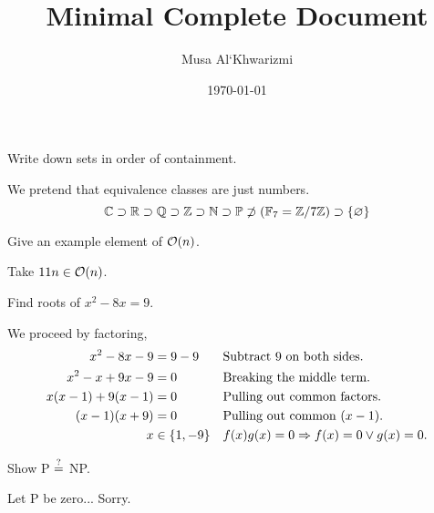 \documentclass{homework}
\author{Musa Al`Khwarizmi}
\date{\today}
\title{Minimal Complete Document}
\begin{document}
 \maketitle

\question Write down sets in order of containment.

We pretend that equivalence classes are just numbers.
\[
  \C \supset \R \supset \Q \supset \Z \supset \N \supset
  \P \not\supset (\GF[7] = \modulo[7])  \supset \{\nil\}
\]

\question Give an example element of $\O(n)$.

Take $11n \in \O(n)$.

\question Find roots of $x^2- 8x = 9$.

We proceed by factoring,
\begin{align*}
  x^2- 8x - 9         &= 9-9 && \text{Subtract 9 on both sides.}         \\
  x^2- x + 9x - 9     &= 0   && \text{Breaking the middle term.}         \\
  x(x - 1) + 9(x - 1) &= 0   && \text{Pulling out common factors.}       \\
  (x - 1)(x + 9)      &= 0   && \text{Pulling out common } (x - 1).      \\
  x           &\in \{1, -9\} && f(x)g(x) = 0 \Ra f(x) = 0 \vee g(x) = 0.
\end{align*}

\question Show P $\?$ NP.

Let P be zero... Sorry.
\end{document}
